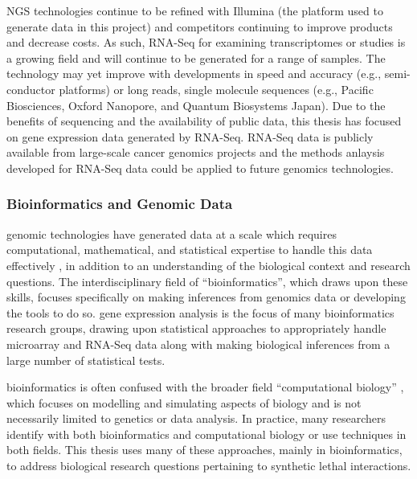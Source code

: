\Gls{NGS} technologies continue to be refined \citep{Goodwin2016} with Illumina (the platform used to generate data in this project) and competitors continuing to improve products and decrease costs. As such, \gls{RNA-Seq} for examining \glspl{transcriptome} or  studies is a growing field and will continue to be generated for a range of samples. The technology may yet improve \citep{Goodwin2016} with developments in speed and accuracy (e.g., semi-conductor platforms) or long reads, single molecule sequences (e.g., Pacific Biosciences, Oxford Nanopore, and Quantum Biosystems Japan).    
Due to the benefits of sequencing and the availability of public data, this thesis has focused on \gls{gene expression} data generated by \gls{RNA-Seq}. \gls{RNA-Seq} data is publicly available from large-scale cancer \glspl{genomic} projects and the methods anlaysis developed for \gls{RNA-Seq} data could be applied to future \glspl{genomic} technologies.


\subsubsection{Bioinformatics and Genomic Data}
\Gls{genomic} technologies have generated data at a scale which requires computational, mathematical, and statistical expertise to handle this data effectively \citep{Markowetz2017, Tran2012}, in addition to an understanding of the biological context and research questions. The interdisciplinary field of ``\gls{bioinformatics}'', which draws upon these skills, focuses specifically on making inferences from \glspl{genomic} data or developing the tools to do so. \Gls{gene expression} analysis is the focus of many \gls{bioinformatics} research groups, drawing upon statistical approaches to appropriately handle \gls{microarray} and \gls{RNA-Seq} data along with making biological inferences from a large number of statistical tests.

\Gls{bioinformatics} is often confused with the broader field ``\gls{computational biology}'' \citep{Markowetz2017}, which focuses on modelling and simulating aspects of biology and is not necessarily limited to genetics or data analysis. In practice, many researchers identify with both \gls{bioinformatics} and \gls{computational biology} or use techniques in both fields. This thesis uses many of these approaches, mainly in \gls{bioinformatics}, to address biological research questions pertaining to \gls{synthetic lethal} interactions.

